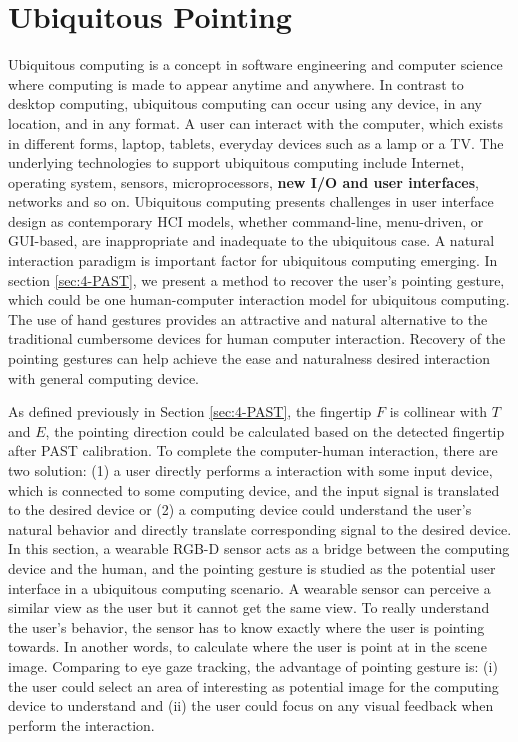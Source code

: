 \section{Ubiquitous Pointing}
Ubiquitous computing is a concept in software engineering and computer science where computing is made to appear anytime and anywhere. In contrast to desktop computing, ubiquitous computing can occur using any device, in any location, and in any format. A user can interact with the computer, which exists in different forms, laptop, tablets, everyday devices such as a lamp or a TV. The underlying technologies to support ubiquitous computing include Internet, operating system, sensors, microprocessors, \textbf{new  I/O and user interfaces}, networks and so on.  Ubiquitous computing presents challenges in user interface design as contemporary HCI models, whether command-line, menu-driven, or GUI-based, are inappropriate and inadequate to the ubiquitous case. A natural interaction paradigm is important factor for ubiquitous computing emerging. In section \ref{sec:4-PAST}, we present a method to recover the user's pointing gesture, which could be one human-computer interaction model for ubiquitous computing. The use of hand gestures provides an attractive and natural alternative to the traditional cumbersome devices for human computer interaction. 
Recovery of the pointing gestures can help achieve the ease and naturalness desired interaction with general computing device.

As defined previously in Section \ref{sec:4-PAST}, the fingertip $F$ is collinear with  $T$ and $E$, the pointing direction could be calculated based on the detected fingertip after PAST calibration. To complete the computer-human interaction, there are two solution: (1) a user directly performs a interaction with some input device, which is connected to some computing device, and the input signal is translated to the desired device or (2) a computing device could understand the user's natural behavior and directly translate corresponding signal to the desired device.  In this section, a wearable RGB-D sensor acts as a bridge between the computing device and the human, and the pointing gesture is studied as the potential user interface in a ubiquitous computing scenario.
A wearable sensor can perceive a similar view as the user but it cannot get the same view. To really understand the user's behavior, the sensor has to know exactly where the user is pointing towards. In another words, to calculate where the user is point at in the scene image.
Comparing to eye gaze tracking, the advantage of pointing gesture is: (i) the user could select an area of interesting as potential image for the computing device to understand and (ii) the user could focus on any visual feedback when perform the interaction.  

